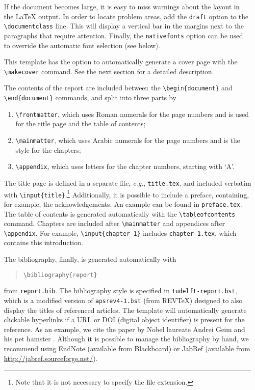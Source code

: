 If the document becomes large, it is easy to miss warnings about the layout in the \LaTeX{} output. In order to locate problem areas, add the \texttt{draft} option to the \texttt{\textbackslash documentclass} line. This will display a vertical bar in the margins next to the paragraphs that require attention. Finally, the \texttt{nativefonts} option can be used to override the automatic font selection (see below).

This template has the option to automatically generate a cover page with the \texttt{\textbackslash makecover} command. See the next section for a detailed description.

The contents of the report are included between the \texttt{\textbackslash begin\{document\}} and \texttt{\textbackslash end\{document\}} commands, and split into three parts by
\begin{enumerate}
\item\texttt{\textbackslash frontmatter}, which uses Roman numerals for the page numbers and is used for the title page and the table of contents;
\item\texttt{\textbackslash mainmatter}, which uses Arabic numerals for the page numbers and is the style for the chapters;
\item\texttt{\textbackslash appendix}, which uses letters for the chapter numbers, starting with `A'.
\end{enumerate}
The title page is defined in a separate file, \emph{e.g.}, \texttt{title.tex}, and included verbatim with \texttt{\textbackslash input\{title\}}.\footnote{Note that it is not necessary to specify the file extension.} Additionally, it is possible to include a preface, containing, for example, the acknowledgements. An example can be found in \texttt{preface.tex}. The table of contents is generated automatically with the \texttt{\textbackslash tableofcontents} command. Chapters are included after \texttt{\textbackslash mainmatter} and appendices after \texttt{\textbackslash appendix}. For example, \texttt{\textbackslash input\{chapter-1\}} includes \texttt{chapter-1.tex}, which contains this introduction.

The bibliography, finally, is generated automatically with
\begin{quote}
    \texttt{\textbackslash bibliography\{report\}}
\end{quote}
from \texttt{report.bib}. The bibliography style is specified in \texttt{tudelft-report.bst}, which is a modified version of \texttt{apsrev4-1.bst} (from REVTeX) designed to also display the titles of referenced articles. The template will automatically generate clickable hyperlinks if a URL or DOI (digital object identifier) is present for the reference. As an example, we cite the paper by Nobel laureate Andrei Geim and his pet hamster \citep{Geim2001}. Although it is possible to manage the bibliography by hand, we recommend using EndNote (available from Blackboard) or JabRef (available from \url{http://jabref.sourceforge.net/}).

